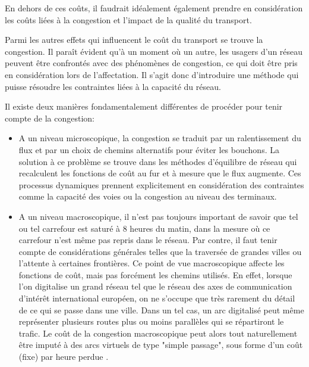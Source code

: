 En dehors de ces coûts, il faudrait idéalement également prendre en
considération les coûts liées à la congestion et l'impact de la
qualité du transport.

Parmi les autres effets qui influencent le coût du transport se trouve la
congestion. Il paraît évident qu'à un moment où un autre, les usagers d'un
réseau peuvent être confrontés avec des phénomènes de congestion, ce qui doit
être pris en considération lors de l'affectation. Il s'agit donc d'introduire
une méthode qui puisse résoudre les contraintes liées à la capacité du réseau.

Il existe deux manières fondamentalement différentes de procéder
pour tenir compte de la congestion:

\begin{itemize}

\item A un niveau microscopique, la congestion se traduit par un
ralentissement du flux et par un choix de chemins alternatifs pour
éviter les bouchons. La solution à ce problème se trouve dans les
méthodes d'équilibre de réseau qui recalculent les fonctions de
coût au fur et à mesure que le flux augmente. Ces processus
dynamiques prennent explicitement en consi\-dération des contraintes
comme la capacité des voies ou la congestion au niveau des
terminaux.

\item A un niveau macroscopique, il n'est pas toujours important de
savoir que tel ou tel carrefour est saturé à 8 heures du matin,
dans la mesure où ce carrefour n'est même pas repris dans le
réseau. Par contre, il faut tenir compte de considérations
générales telles que la traversée de grandes villes ou l'attente à
certaines frontières. Ce point de vue macroscopique affecte les
fonctions de coût, mais pas forcément les chemins utilisés. En
effet, lorsque l'on digitalise un grand réseau tel que le réseau
des axes de communication d'intérêt international européen, on ne
s'occupe que très rarement  du détail de ce qui se passe dans une
ville. Dans un tel  cas, un arc digitalisé peut même représenter
plusieurs routes plus ou moins parallèles qui se répartiront le
trafic. Le coût de la congestion macroscopique peut alors tout
naturellement être imputé à des arcs virtuels de type "simple
passage", sous forme d'un coût (fixe) par heure perdue .
\end{itemize}


